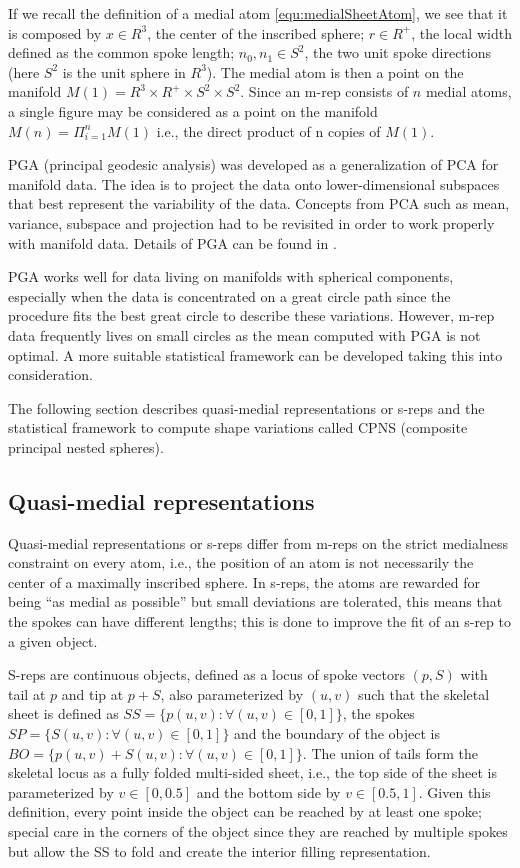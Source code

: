 If we recall the definition of a medial atom \ref{equ:medialSheetAtom},
we see that it is composed by $x \in R^3$, the center of the
inscribed sphere; $r \in R^+$, the local width defined as the
common spoke length; $n_0, n_1 \in S^2$, the two unit spoke
directions (here $S^2$ is the unit sphere in $R^3$).
The medial atom is then a point on the manifold
$M(1) = R^3 \times R^+ \times S^2 \times S^2$. 
Since an m-rep consists of $n$ medial atoms, 
a single figure may be considered as a point
on the manifold $M(n) = \Pi_{i=1}^n M(1)$ i.e., the direct product
of n copies of $M(1)$.

PGA (principal geodesic analysis) was developed as a generalization of PCA
for manifold data. 
The idea is to project the data onto lower-dimensional 
subspaces that best represent the variability of the data. 
Concepts from PCA such as mean, variance, subspace and projection 
had to be revisited in order to work properly with manifold data.
Details of PGA can be found in \cite{fletcher2004principal}.

PGA works well for data living on manifolds with spherical components, 
especially when the data is concentrated on a great circle path 
since the procedure fits the best great circle to describe these variations.
However, m-rep data frequently lives on small circles
as the mean computed with PGA is not optimal.
A more suitable statistical framework can be developed taking this into consideration. 

The following section describes quasi-medial representations or s-reps and
the statistical framework to compute shape variations called CPNS (composite 
principal nested spheres).


\subsection{Quasi-medial representations}
\label{sec:quasiMedial}

Quasi-medial representations or s-reps \cite{pizer_nested_2012} differ from m-reps on the strict medialness
constraint on every atom, i.e., the position of an atom is not necessarily the center 
of a maximally inscribed sphere. 
In s-reps, the atoms are rewarded for being ``as medial as possible'' but small 
deviations are tolerated, this means that the spokes can have different lengths;
this is done to improve the fit of an s-rep to a given object.

S-reps are continuous objects, defined as a locus of spoke vectors $(p, S)$ 
with tail at $p$ and tip at $p + S$, also parameterized by $(u, v)$ such that 
the skeletal sheet is defined as $SS = \{p(u, v) : \forall (u, v) \in [0, 1] \}$, the
spokes $SP = \{S(u, v) : \forall (u, v) \in [0, 1] \}$ and 
the boundary of the object is $BO = \{p(u, v) + S(u, v) : \forall (u, v) \in [0, 1] \}$.
The union of tails form the skeletal locus as a fully folded 
multi-sided sheet, i.e., the top side of the sheet is parameterized by $v \in [0, 0.5]$
and the bottom side by $v \in [0.5, 1]$.
Given this definition, every point inside the object can be reached by at least one spoke; 
special care in the corners of the object since they are reached by multiple spokes but allow the SS 
to fold and create the interior filling representation.

